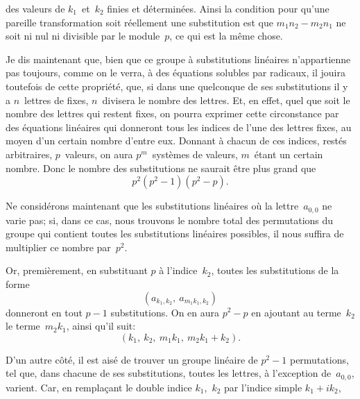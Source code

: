 des valeurs de $k_{1}$~et~$k_{2}$ finies et déterminées. Ainsi la condition
pour qu'une pareille transformation soit réellement une substitution
est que $m_{1}n_{2} - m_{2}n_{1}$ ne soit ni nul ni divisible par le module~$p$,
ce qui est la même chose.

Je dis maintenant que, bien que ce groupe à substitutions
linéaires n'appartienne pas toujours, comme on le verra, à des
équations solubles par radicaux, il jouira toutefois de cette propriété,
que, si dans une quelconque de ses substitutions il y a $n$~lettres
de fixes, $n$~divisera le nombre des lettres. Et, en effet, quel
que soit le nombre des lettres qui restent fixes, on pourra exprimer
cette circonstance par des équations linéaires qui donneront
tous les indices de l'une des lettres fixes, au moyen d'un certain
nombre d'entre eux. Donnant à chacun de ces indices, restés arbitraires,
$p$~valeurs, on aura $p^{m}$~systèmes de valeurs, $m$~étant un certain
nombre.  Donc le nombre des
substitutions ne saurait être plus grand que
\[
p^{2}(p^{2} - 1)(p^{2} - p).
\]

Ne considérons maintenant que les substitutions linéaires où la
lettre~$a_{0,0}$ ne varie pas; si, dans ce cas, nous trouvons le nombre
total des permutations du groupe qui contient toutes les substitutions
linéaires possibles, il nous suffira de multiplier ce nombre
par~$p^{2}$.

Or, premièrement, en substituant $p$ à l'indice~$k_{2}$, toutes les
substitutions de la forme
\[
(a_{k_{1}, k_{2}},\ a_{m_{1}k_{1}, k_{2}})
\]
donneront en tout $p - 1$ substitutions. On en aura $p^{2} - p$ en
ajoutant au terme~$k_{2}$ le terme~$m_{2}k_{1}$, ainsi qu'il suit:
\[
\tag{m'}
(k_{1},\ k_{2},\ m_{1}k_{1},\ m_{2}k_{1} + k_{2}).
\]

D'un autre côté, il est aisé de trouver un groupe linéaire
de $p^{2} - 1$ permutations, tel que, dans chacune de ses substitutions,
toutes les lettres, à l'exception de~$a_{0,0}$, varient. Car, en
remplaçant le double indice $k_{1}$,~$k_{2}$ par l'indice simple $k_{1} + ik_{2}$,
